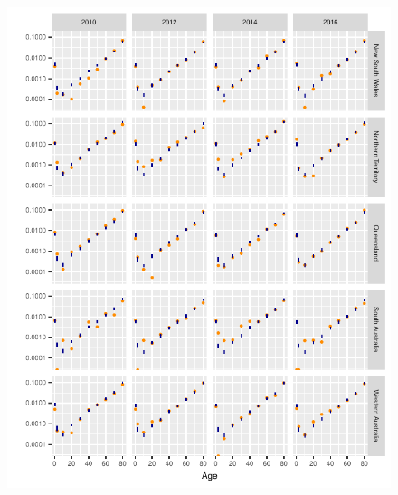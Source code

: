\documentclass{article}
\begin{document}
\begin{figure}
  \centering
  \includegraphics{out/fig_rates_modelled_Female_Indigenous_Baseline}
\end{figure}
\newpage
\end{document}
